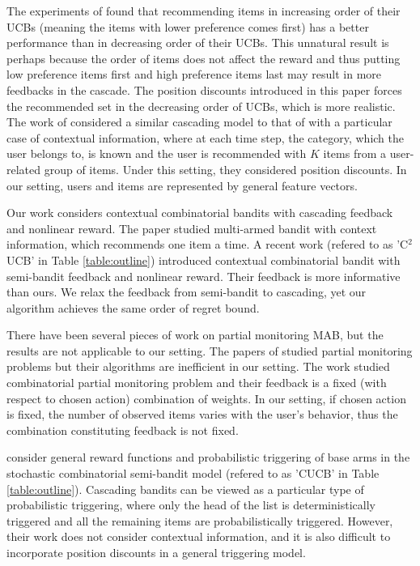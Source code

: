 \documentclass{article}
\begin{document}
The experiments of \cite{kveton2015cascading} found that recommending items in increasing order of their UCBs (meaning the items with lower preference comes first) has a better performance than in decreasing order of their UCBs.
This unnatural result is perhaps because the order of items does not affect the reward and thus
	putting low preference items first and high preference items last may result in more feedbacks
	in the cascade.
The position discounts introduced in this paper forces the recommended set in the decreasing order 
	of UCBs, which is more realistic.
The work of \cite{combes2015learning} considered a similar cascading model to that of \cite{kveton2015cascading} with a particular case of contextual information, where at each time step, the category, which the user belongs to, is known and the user is recommended with $K$ items from a user-related group of items. Under this setting, they considered position discounts.
In our setting, users and items are represented by general feature vectors.

Our work considers contextual combinatorial bandits with cascading feedback and nonlinear reward. The paper \cite{li2010contextual} studied multi-armed bandit with context information, which recommends one item a time. A recent work \cite{qin2014contextual} (refered to as 'C$^2$UCB' in Table \ref{table:outline}) introduced contextual combinatorial bandit with semi-bandit feedback and nonlinear reward. Their feedback is more informative than ours. We relax the feedback from semi-bandit to cascading, yet our algorithm achieves the same order of regret bound.

There have been several pieces of work on partial monitoring MAB, but the results are not applicable to our setting. The papers of \cite{agrawal1989asymptotically,bartok2012adaptive} studied partial monitoring problems but their algorithms are inefficient in our setting. The work \cite{lin2014combinatorial} studied combinatorial partial monitoring problem and their feedback is a fixed (with respect to chosen action) combination of weights. In our setting, if chosen action is fixed, the number of observed items varies with the user's behavior, thus the combination constituting feedback is not fixed.

\citet{chen2015combinatorial} consider general reward functions and probabilistic triggering of base arms
	in the  stochastic combinatorial semi-bandit model (refered to as 'CUCB' in Table \ref{table:outline}).
Cascading bandits can be viewed as a particular type of probabilistic triggering, where
	only the head of the list is deterministically triggered and all the remaining items are
	probabilistically triggered.
However, their work does not consider contextual information, and it is also difficult to
	incorporate position discounts in a general triggering model.
\end{document}
